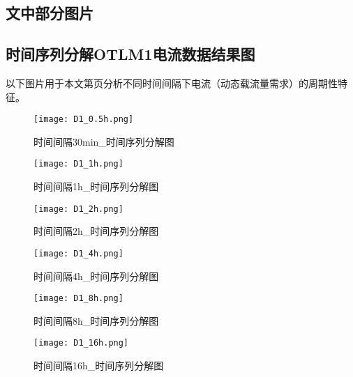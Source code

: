 \documentclass[withoutpreface,bwprint]{cumcmthesis}  %
\begin{document}
	\begin{appendices}
		
		\section{文中部分图片}
        \subsection{时间序列分解OTLM1电流数据结果图}
        以下图片用于本文第\pageref{model_1}页分析不同时间间隔下电流（动态载流量需求）的周期性特征。         
        \begin{figure}[h!] 
            \begin{minipage}{.45\textwidth} %
                \centering  
                \texttt{[image: D1\_0.5h.png]}  
                \caption{时间间隔30min\_时间序列分解图}  
            \end{minipage}  
            \hfill %
            \begin{minipage}{.45\textwidth} %
                \centering  
                \texttt{[image: D1\_1h.png]}  
                \caption{时间间隔1h\_时间序列分解图}  
            \end{minipage}  
        \end{figure}
        
        \begin{figure}[h!] 
            \begin{minipage}{.45\textwidth} %
                \centering  
                \texttt{[image: D1\_2h.png]}  
                \caption{时间间隔2h\_时间序列分解图}  
            \end{minipage}  
            \hfill %
            \begin{minipage}{.45\textwidth} %
                \centering  
                \texttt{[image: D1\_4h.png]}  
                \caption{时间间隔4h\_时间序列分解图}  
            \end{minipage}  
        \end{figure}

        \begin{figure}[h!] 
            \begin{minipage}{.45\textwidth} %
                \centering  
                \texttt{[image: D1\_8h.png]}  
                \caption{时间间隔8h\_时间序列分解图}  
            \end{minipage}  
            \hfill %
            \begin{minipage}{.45\textwidth} %
                \centering  
                \texttt{[image: D1\_16h.png]}  
                \caption{时间间隔16h\_时间序列分解图}  
            \end{minipage}  
        \end{figure}


\end{appendices}
\end{document}
